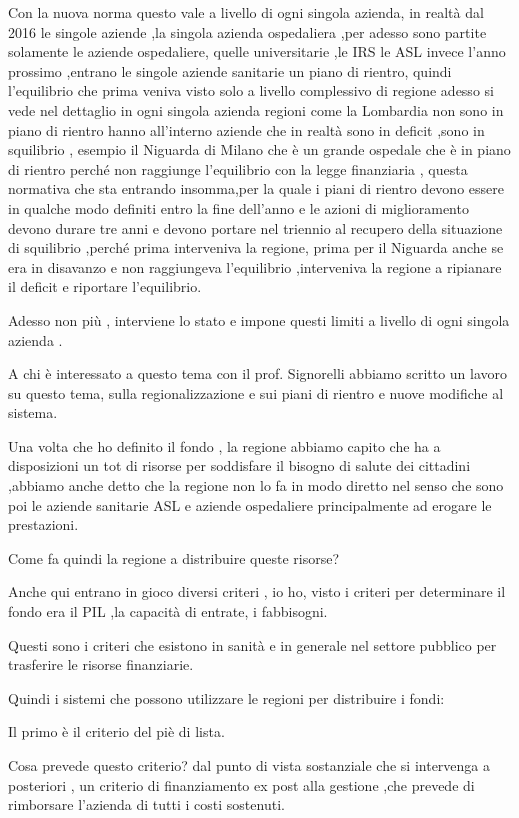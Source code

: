 Con la nuova norma questo vale a livello di ogni singola azienda, in
realtà dal 2016 le singole aziende ,la singola azienda ospedaliera ,per
adesso sono partite solamente le aziende ospedaliere, quelle
universitarie ,le IRS le ASL invece l'anno prossimo ,entrano le singole
aziende sanitarie un piano di rientro, quindi l'equilibrio che prima
veniva visto solo a livello complessivo di regione adesso si vede nel
dettaglio in ogni singola azienda regioni come la Lombardia non sono in
piano di rientro hanno all'interno aziende che in realtà sono in deficit
,sono in squilibrio , esempio il Niguarda di Milano che è un grande
ospedale che è in piano di rientro perché non raggiunge l'equilibrio con
la legge finanziaria , questa normativa che sta entrando insomma,per la
quale i piani di rientro devono essere in qualche modo definiti entro la
fine dell'anno e le azioni di miglioramento devono durare tre anni e
devono portare nel triennio al recupero della situazione di squilibrio
,perché prima interveniva la regione, prima per il Niguarda anche se era
in disavanzo e non raggiungeva l'equilibrio ,interveniva la regione a
ripianare il deficit e riportare l'equilibrio.

Adesso non più , interviene lo stato e impone questi limiti a livello di
ogni singola azienda .

A chi è interessato a questo tema con il prof. Signorelli abbiamo
scritto un lavoro su questo tema, sulla regionalizzazione e sui piani di
rientro e nuove modifiche al sistema.

Una volta che ho definito il fondo , la regione abbiamo capito che ha a
disposizioni un tot di risorse per soddisfare il bisogno di salute dei
cittadini ,abbiamo anche detto che la regione non lo fa in modo diretto
nel senso che sono poi le aziende sanitarie ASL e aziende ospedaliere
principalmente ad erogare le prestazioni.

Come fa quindi la regione a distribuire queste risorse?

Anche qui entrano in gioco diversi criteri , io ho, visto i criteri per
determinare il fondo era il PIL ,la capacità di entrate, i fabbisogni.

Questi sono i criteri che esistono in sanità e in generale nel settore
pubblico per trasferire le risorse finanziarie.

Quindi i sistemi che possono utilizzare le regioni per distribuire i
fondi:

Il primo è il criterio del piè di lista.

Cosa prevede questo criterio? dal punto di vista sostanziale che si
intervenga a posteriori , un criterio di finanziamento ex post alla
gestione ,che prevede di rimborsare l'azienda di tutti i costi
sostenuti.

